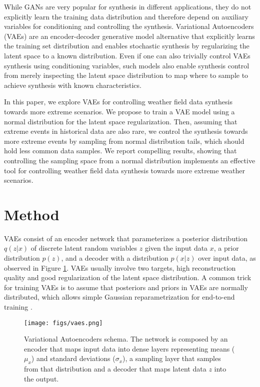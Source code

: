 \documentclass{article}
\begin{document}
While GANs are very popular for synthesis in different applications, they do not explicitly learn the training data distribution and therefore depend on auxiliary variables for conditioning and controlling the synthesis. Variational Autoencoders (VAEs) \cite{vaes} are an encoder-decoder generative model alternative that explicitly learns the training set distribution and enables stochastic synthesis by regularizing the latent space to a known distribution. Even if one can also trivially control VAEs synthesis using conditioning variables, such models also enable synthesis control from merely inspecting the latent space distribution to map where to sample to achieve synthesis with known characteristics.

In this paper, we explore VAEs for controlling weather field data synthesis towards more extreme scenarios. We propose to train a VAE model using a normal distribution for the latent space regularization. Then, assuming that extreme events in historical data are also rare, we control the synthesis towards more extreme events by sampling from normal distribution tails, which should hold less common data samples. We report compelling results, showing that controlling the sampling space from a normal distribution implements an effective tool for controlling weather field data synthesis towards more extreme weather scenarios.

\section{Method}

VAEs consist of an encoder network that parameterizes a posterior distribution $q(z|x)$ of discrete latent random variables $z$ given the input data $x$, a prior distribution $p(z)$, and a decoder with a distribution $p(x|z)$ over input data, as observed in Figure \ref{fig:vae}. VAEs usually involve two targets, high reconstruction quality and good regularization of the latent space distribution. A common trick for training VAEs is to assume that posteriors and priors in VAEs are normally distributed, which allows simple Gaussian reparametrization for end-to-end training \cite{pmlr-v32-rezende14,vaes}.

\begin{figure}[h!]
	\centering
		\texttt{[image: figs/vaes.png]}
	\caption{Variational Autoencoders schema. The network is composed by an encoder that maps input data into dense layers representing means ($\mu_x$) and standard deviations ($\sigma_x$), a sampling layer that samples from that distribution and a decoder that maps latent data $z$ into the output.}
	\label{fig:vae}
\end{figure}
\end{document}
